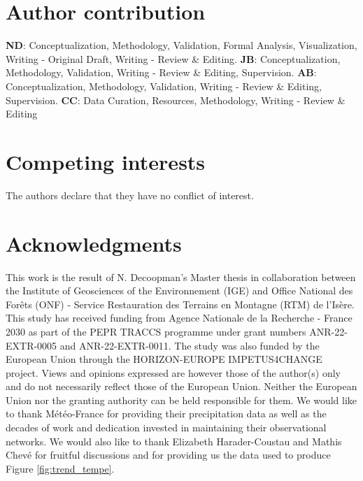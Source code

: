 ﻿\documentclass[hess, manuscript]{copernicus}
\providecommand{\DIFaddbegin}{} %
\providecommand{\DIFaddend}{} %
\providecommand{\DIFdelbegin}{} %
\providecommand{\DIFdelend}{} %
\begin{document}
\section*{Author contribution}
\textbf{ND}: Conceptualization, Methodology, Validation, Formal Analysis, Visualization, Writing - Original Draft, Writing - Review \& Editing. \textbf{JB}: Conceptualization, Methodology, Validation, Writing - Review \& Editing, Supervision. \textbf{AB}: Conceptualization, Methodology, Validation, Writing - Review \& Editing, Supervision. \textbf{CC}: Data Curation, Resources, Methodology, Writing - Review \& Editing

\section*{Competing interests}
The authors declare that they have no conflict of interest.

\section*{Acknowledgments}
This work is the result of N. Decoopman's Master thesis in collaboration between the Institute of Geosciences of the Environnement (IGE) and Office National des Forêts (ONF) - Service Restauration des Terrains en Montagne (RTM) de l'Isère. This study has received funding from Agence Nationale de la Recherche - France 2030 as part of the PEPR TRACCS programme under grant numbers ANR-22-EXTR-0005 and ANR-22-EXTR-0011. The study was also funded by the European Union through the HORIZON-EUROPE IMPETUS4CHANGE project. Views and opinions expressed are however those of the author(s) only and do not necessarily reflect those of the European Union. Neither the European Union nor the granting authority can be held responsible for them. We would like to thank Météo-France for providing their precipitation data as well as the decades of work and dedication invested in maintaining their observational networks. We would also like to thank Elizabeth Harader-Coustau and Mathis Chevé for fruitful discussions and for providing us the data used to produce Figure \ref{fig:trend_tempe}.

\DIFdelbegin %

\DIFdelend \DIFaddbegin 
\DIFaddend 
\end{document}
